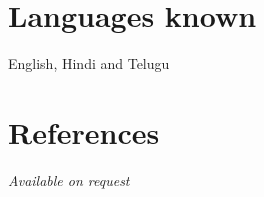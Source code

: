 \documentclass[line]{resume}
\begin{document}
{\begin{resume}
				\section{\mysidestyle Languages known}
				English, Hindi and Telugu 
			
			\section{\mysidestyle References} 
        \textsl{Available on request}  
				
				

\end{resume}}
\end{document}
